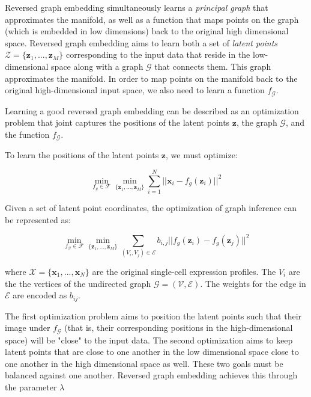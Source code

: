 \documentclass[10pt,oneside]{article}\usepackage[]{graphicx}\usepackage[]{color}
\begin{document}
Reversed graph embedding simultaneously learns a \emph{principal graph} that
approximates the manifold, as well as a function that maps points on the graph 
(which is embedded in low dimensions) back to the original high dimensional space.
Reversed graph embedding aims to learn both a set of \emph{latent points} 
$\mathcal{Z} = \{\mathbf{z}_1, ..., \mathbf{z}_M\}$ corresponding to the input data
that reside in the low-dimensional space along with a graph $\mathcal{G}$ that
connects them. This graph approximates the manifold. In order to map points on 
the manifold back to the original high-dimensional input space, we also need to 
learn a function $f_{\mathcal{G}}$.  

Learning a good reversed graph embedding can be described as an optimization problem that 
joint captures the positions of the latent points $\mathbf{z}$, the graph $\mathcal{G}$, and the function
$f_\mathcal{G}$.

To learn the positions of the latent points $\mathbf{z}$, we must optimize:

\begin{equation}
\mathop{min}_{f_g \in \mathcal{F}} \mathop{min}_{\{\mathbf{z}_1, ...,
\mathbf{z}_M\}} \sum_{i = 1}^N ||\mathbf{x}_i - f_g (\mathbf{z}_i)||^2
\end{equation}

Given a set of latent point coordinates, the optimization of graph inference can 
be represented as:

\begin{equation} \label{eq:mintree}
\mathop{min}_{f_\mathcal{G} \in \mathcal{F}} \mathop{min}_{\{\mathbf{z}_1, ..., \mathbf{z}_M\}} \sum_{(V_i, V_j) \in
\mathcal{E}} b_{i,j}||f_g(\mathbf{z}_i) - f_g(\mathbf{z}_j)||^2
\end{equation}

where
$\mathcal{X} = \{ \mathbf{x}_1, ..., \mathbf{x}_N\}$ are the original 
single-cell expression profiles. The $V_i$ are the the vertices of the 
undirected graph $\mathcal{G} = (\mathcal{V}, \mathcal{E})$. The weights for the 
edge in $\mathcal{E}$ are encoded as $b_{ij}$.

The first optimization problem aims to position the latent points such that their
image under $f_\mathcal{G}$ (that is, their corresponding positions in the high-dimensional space) 
will be "close" to the input data. The second optimization aims to keep latent
points that are close to one another in the low dimensional space close to one 
another in the high dimensional space as well. These two goals must be balanced
against one another. Reversed graph embedding achieves this through the parameter
$\lambda$
\end{document}
